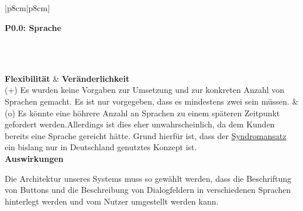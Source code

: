 \documentclass[enabledeprecatedfontcommands,fontsize=11pt,paper=a4,twoside]{scrartcl}
\newcounter{one}
\newcounter{two}[one]
\newcommand{\tone}{0\theone}
\newcommand{\two}{\stepcounter{two}0\thetwo}
\begin{document}
\\ \\ \\ \\ %
\begin{tabular} {|p{8cm}|p{8cm}|}
	\hline
	 {\parbox{16cm}{\textbf{\hypertarget{gg}{P\tone.\two}: Sprache}} }\\ \hline \hline
	\rule{0pt}{7ex}\\ [1ex] \hline
	\textbf{Flexibilität}  & \textbf{Veränderlichkeit} \\
	(+) Es wurden keine Vorgaben zur Umsetzung und zur konkreten Anzahl von Sprachen gemacht. Es ist nur vorgegeben, dass es mindestens zwei sein müssen. &
	(o) Es könnte eine höhrere Anzahl an Sprachen zu einem späteren Zeitpunkt gefordert werden.Allerdings ist dies eher unwahrscheinlich, da dem Kunden bereits eine Sprache gereicht hätte. Grund hierfür ist, dass der \hyperlink{Syndromansatz}{Syndromansatz} ein bislang nur in Deutschland genutztes Konzept ist. \\ \hline
	 {\textbf{Auswirkungen}} \\
	 {\parbox{16cm}{Die Architektur unseres Systems muss so gewählt werden, dass die Beschriftung von Buttons und die Beschreibung von Dialogfeldern in verschiedenen Sprachen hinterlegt werden und vom Nutzer umgestellt werden kann.} }\\ \hline
\end{tabular}
\\ \\ \\ \\ %
\end{document}
